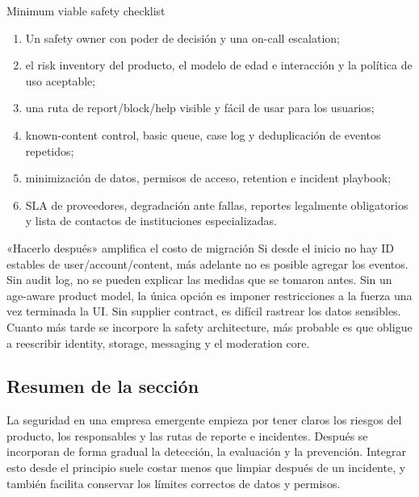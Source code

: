\begin{importantbox}{Minimum viable safety checklist}
\begin{enumerate}
  \item Un safety owner con poder de decisión y una on-call escalation;
  \item el risk inventory del producto, el modelo de edad e interacción y la política de uso aceptable;
  \item una ruta de report/block/help visible y fácil de usar para los usuarios;
  \item known-content control, basic queue, case log y deduplicación de eventos repetidos;
  \item minimización de datos, permisos de acceso, retention e incident playbook;
  \item SLA de proveedores, degradación ante fallas, reportes legalmente obligatorios y lista de contactos de instituciones especializadas.
\end{enumerate}
\end{importantbox}

\begin{warningbox}{«Hacerlo después» amplifica el costo de migración}
Si desde el inicio no hay ID estables de user/account/content, más adelante no es posible agregar los eventos. Sin audit log, no se pueden explicar las medidas que se tomaron antes. Sin un age-aware product model, la única opción es imponer restricciones a la fuerza una vez terminada la UI. Sin supplier contract, es difícil rastrear los datos sensibles. Cuanto más tarde se incorpore la safety architecture, más probable es que obligue a reescribir identity, storage, messaging y el moderation core.
\end{warningbox}


\subsection{Resumen de la sección}

La seguridad en una empresa emergente empieza por tener claros los riesgos del producto, los responsables y las rutas de reporte e incidentes. Después se incorporan de forma gradual la detección, la evaluación y la prevención. Integrar esto desde el principio suele costar menos que limpiar después de un incidente, y también facilita conservar los límites correctos de datos y permisos.
